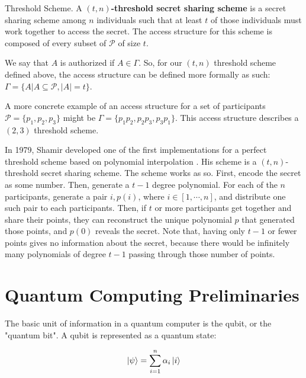 \theoremstyle{definition}
\begin{definition}{Threshold Scheme.}
    A \textbf{$(t,n)$-threshold secret sharing scheme} is a secret sharing scheme among $n$ individuals such that at least $t$ of those individuals must work together to access the secret. The access structure for this scheme is composed of every subset of $\mathcal{P}$ of size $t$.
\end{definition}

We say that $A$ is authorized if $A \in \Gamma$. So, for our $(t,n)$ threshold scheme defined above, the access structure can be defined more formally as such: $\Gamma = \{A | A \subseteq \mathcal{P} , |A| = t\}$.

A more concrete example of an access structure for a set of participants $\mathcal{P} = \{p_1,p_2,p_3\}$ might be $\Gamma = \{p_1p_2,p_2p_3,p_3p_1\}$. This access structure describes a $(2,3)$ threshold scheme.

In 1979, Shamir developed one of the first implementations for a perfect threshold scheme based on polynomial interpolation \cite{shamir-whisper}. His scheme is a $(t,n)$-threshold secret sharing scheme. The scheme works as so. First, encode the secret as some number. Then, generate a $t-1$ degree polynomial. For each of the $n$ participants, generate a pair $i, p(i)$, where $i \in [1, \cdots, n]$, and distribute one such pair to each participants. Then, if $t$ or more participants get together and share their points, they can reconstruct the unique polynomial $p$ that generated those points, and $p(0)$ reveals the secret. Note that, having only $t-1$ or fewer points gives no information about the secret, because there would be infinitely many polynomials of degree $t-1$ passing through those number of points.

\section{Quantum Computing Preliminaries}

The basic unit of information in a quantum computer is the qubit, or the "quantum bit". A qubit is represented as a quantum state:

\begin{align*}
    \ket{\psi} &= \sum_{i=1}^n \alpha_i\ket{i} \\ 
\end{align*}


